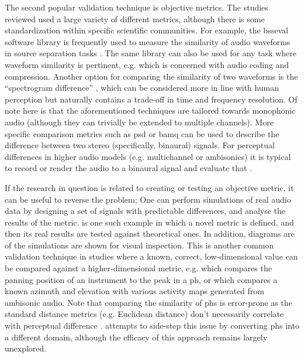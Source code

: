 \documentclass[referee,pdflatex,sn-mathphys-num]{sn-jnl}%
\newcommand{\q}[1]{\enquote{#1}}
\begin{document}
The second popular validation technique is objective metrics. The studies reviewed used a large variety of different metrics, although there is some standardization within specific scientific communities. For example, the \gls{bsseval} software library is frequently used to measure the similarity of audio waveforms in source separation tasks \cite{vincentPerformanceMeasurementBlind2006}. The same library can also be used for any task where waveform similarity is pertinent, e.g. \cite{wuStackedSparseAutoencoder2021} which is concerned with audio coding and compression. Another option for comparing the similarity of two waveforms is the \q{spectrogram difference} \cite{hsuModelMatchingPrincipleApplied2023}, which can be considered more in line with human perception but naturally contains a trade-off in time and frequency resolution. Of note here is that the aforementioned techniques are tailored towards monophonic audio (although they can trivially be extended to multiple channels). More specific comparison metrics such as \gls{psd} \cite{armstrongPerceptualSpectralDifference2018} or \gls{bamq} \cite{flessnerAssessmentPredictionBinaural2017} can be used to describe the difference between two stereo (specifically, binaural) signals. For perceptual differences in higher audio models (e.g. multichannel or ambisonics) it is typical to record or render the audio to a binaural signal and evaluate that \cite{choiObjectiveMeasurementPerceived2008,kiyanPredictingImmersionSurround2023,stahlPerceptualComparisonParametric2023}.

If the research in question is related to creating or testing an objective metric, it can be useful to reverse the problem; One can perform simulations of real audio data by designing a set of signals with predictable differences, and analyse the results of the metric. \cite{watcharasupatQuantifyingSpatialAudio2024} is one such example in which a novel metric is defined, and then its real results are tested against theoretical ones. In addition, diagrams are of the simulations are shown for visual inspection. This is another common validation technique in studies where a known, correct, low-dimensional value can be compared against a higher-dimensional metric, e.g. \cite{takanenBinauralAuditoryModel2012} which compares the panning position of an instrument to the peak in a \gls{ph}, or \cite{lluisDeepLearningApproach2022} which compares a known azimuth and elevation with various activity maps generated from ambisonic audio. Note that comparing the similarity of \glspl{ph} is error-prone as the standard distance metrics (e.g. Euclidean distance) don't necessarily correlate with perceptual difference \cite{miticObjectiveComparisonPanning2025}. \cite{gomezMusicSimilaritySystems2008} attempts to side-step this issue by converting \glspl{ph} into a different domain, although the efficacy of this approach remains largely unexplored.
\end{document}
